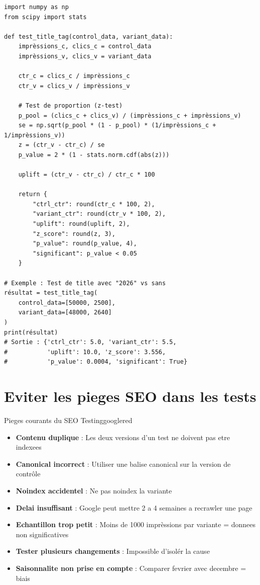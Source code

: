 \begin{lstlisting}[style=code,caption={Exemple de test A/B sur les title tags (Python)}]
import numpy as np
from scipy import stats

def test_title_tag(control_data, variant_data):
    imprèssions_c, clics_c = control_data
    imprèssions_v, clics_v = variant_data

    ctr_c = clics_c / imprèssions_c
    ctr_v = clics_v / imprèssions_v

    # Test de proportion (z-test)
    p_pool = (clics_c + clics_v) / (imprèssions_c + imprèssions_v)
    se = np.sqrt(p_pool * (1 - p_pool) * (1/imprèssions_c + 1/imprèssions_v))
    z = (ctr_v - ctr_c) / se
    p_value = 2 * (1 - stats.norm.cdf(abs(z)))

    uplift = (ctr_v - ctr_c) / ctr_c * 100

    return {
        "ctrl_ctr": round(ctr_c * 100, 2),
        "variant_ctr": round(ctr_v * 100, 2),
        "uplift": round(uplift, 2),
        "z_score": round(z, 3),
        "p_value": round(p_value, 4),
        "significant": p_value < 0.05
    }

# Exemple : Test de title avec "2026" vs sans
résultat = test_title_tag(
    control_data=[50000, 2500],
    variant_data=[48000, 2640]
)
print(résultat)
# Sortie : {'ctrl_ctr': 5.0, 'variant_ctr': 5.5,
#           'uplift': 10.0, 'z_score': 3.556,
#           'p_value': 0.0004, 'significant': True}
\end{lstlisting}

\section{Eviter les pieges SEO dans les tests}

\begin{mybox}{Pieges courants du SEO Testing}{googlered}
\begin{itemize}
    \item \textbf{Contenu duplique} : Les deux versions d'un test ne doivent pas etre indexees
    \item \textbf{Canonical incorrect} : Utiliser une balise canonical sur la version de contrôle
    \item \textbf{Noindex accidentel} : Ne pas noindex la variante
    \item \textbf{Delai insuffisant} : Google peut mettre 2 a 4 semaines a recrawler une page
    \item \textbf{Echantillon trop petit} : Moins de 1000 imprèssions par variante = donnees non significatives
    \item \textbf{Tester plusieurs changements} : Impossible d'isolér la cause
    \item \textbf{Saisonnalite non prise en compte} : Comparer fevrier avec decembre = biais
\end{itemize}
\end{mybox}

